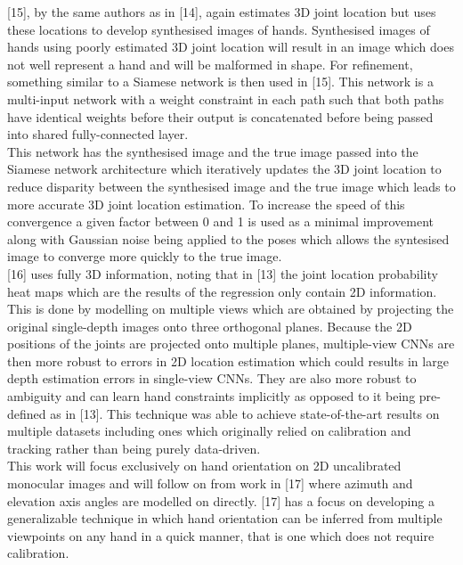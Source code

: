 \documentclass{article}
\begin{document}
[15], by the same authors as in [14], again estimates 3D joint location but uses these locations to develop synthesised images of hands. Synthesised images of hands using poorly estimated 3D joint location will result in an image which does not well represent a hand and will be malformed in shape. For refinement, something similar to a Siamese network is then used in [15]. This network is a multi-input network with a weight constraint in each path such that both paths have identical weights before their output is concatenated before being passed into shared fully-connected layer.\\

This network has the synthesised image and the true image passed into the Siamese network architecture which iteratively updates the 3D joint location to reduce disparity between the synthesised image and the true image which leads to more accurate 3D joint location estimation. To increase the speed of this convergence a given factor between 0 and 1 is used as a minimal improvement along with Gaussian noise being applied to the poses which allows the syntesised image to converge more quickly to the true image.\\

[16] uses fully 3D information, noting that in [13] the joint location probability heat maps which are the results of the regression only contain 2D information. This is done by modelling on multiple views which are obtained by projecting the original single-depth images onto three orthogonal planes. Because the 2D positions of the joints are projected onto multiple planes, multiple-view CNNs are then more robust to errors in 2D location estimation which could results in large depth estimation errors in single-view CNNs. They are also more robust to ambiguity and can learn hand constraints implicitly as opposed to it being pre-defined as in [13]. This technique was able to achieve state-of-the-art results on multiple datasets including ones which originally relied on calibration and tracking rather than being purely data-driven.\\

This work will focus exclusively on hand orientation on 2D uncalibrated monocular images and will follow on from work in [17] where azimuth and elevation axis angles are modelled on directly. [17] has a focus on developing a generalizable technique in which hand orientation can be inferred from multiple viewpoints on any hand in a quick manner, that is one which does not require calibration.\\
\end{document}
